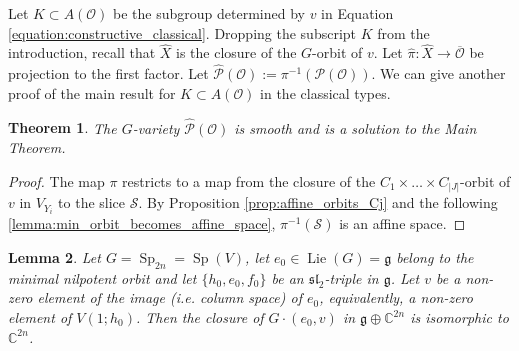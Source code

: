 \documentclass{amsart}
\newtheorem{theorem}{Theorem}[section]
\newtheorem{lemma}[theorem]{Lemma}
\theoremstyle{definition}
\DeclareMathOperator{\Lie}{Lie}
\DeclareMathOperator{\Sp}{Sp}
\newcommand{\C}{\mathbb{C}}
\newcommand{\g}{\mathfrak{g}}
\newcommand{\0}{\mathcal{O}}
\newcommand{\Phat}{\hat{\mathcal P}(\0)}  %
\begin{document}


    

 
 
Let $K \subset A(\0)$ be the subgroup determined by $v$ in Equation \eqref{equation:constructive_classical}.
Dropping the subscript $K$ from the introduction, 
recall that $\hat{X}$ is the closure of the $G$-orbit of $v$.
Let $\hat\pi: \hat{X} \to \overline{\0}$ be projection to the first factor.  Let $\Phat  := \pi^{-1}({\mathcal P}(\0))$.
We can give another proof of the main result for $K \subset A(\0)$ in the classical types.  %

\begin{theorem}\label{theorem:explict_model_classical}
	The $G$-variety $\Phat$ is smooth and is a solution to the Main Theorem.
\end{theorem}

\begin{proof}
The map $\pi$ restricts to a map from the closure of the 
$C_1 \times \dots \times C_{|J|}$-orbit of $v$ in $V_{Y_i}$ 
to the slice $\mathcal S$.  
By Proposition \ref{prop:affine_orbits_Cj} and the following  \cref{lemma:min_orbit_becomes_affine_space},
$\pi^{-1}(\mathcal S)$ is an affine space.
\end{proof}

\begin{lemma}\label{splem} \label{lemma:min_orbit_becomes_affine_space}
Let $G=\Sp_{2n}=\Sp(V)$, let $e_0\in\Lie(G)=\g$ belong to the minimal nilpotent orbit and let $\{ h_0,e_0,f_0\}$ be an $\mathfrak{sl}_2$-triple in $\g$.
Let $v$ be a non-zero element of the image (i.e. column space) of $e_0$, equivalently, a non-zero element of $V(1;h_0)$.
Then the closure of $G\cdot (e_0,v)$ in $\g\oplus \C^{2n}$ is isomorphic to $\C^{2n}$.
\end{lemma}
\end{document}
